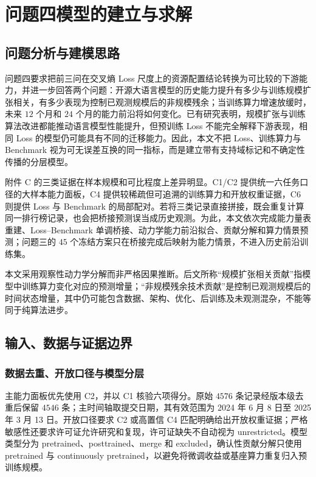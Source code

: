 \section{问题四模型的建立与求解}
\label{sec:problem4}

\subsection{问题分析与建模思路}

问题四要求把前三问在交叉熵 Loss 尺度上的资源配置结论转换为可比较的下游能力，并进一步回答两个问题：开源大语言模型的历史能力提升有多少与训练规模扩张相关，有多少表现为控制已观测规模后的非规模残余；当训练算力增速放缓时，未来 $12$ 个月和 $24$ 个月的能力前沿将如何变化。已有研究表明，规模扩张与训练算法改进都能推动语言模型性能提升，但预训练 Loss 不能完全解释下游表现，相同 Loss 的模型仍可能具有不同的迁移能力\cite{ho2024algorithmicprogress,liu2023samepretraining}。因此，本文不把 Loss、训练算力与 Benchmark 视为可无误差互换的同一指标，而是建立带有支持域标记和不确定性传播的分层模型。

附件 C 的三类证据在样本规模和可比程度上差异明显。C1/C2 提供统一六任务口径的大样本能力面板，C4 提供较稀疏但可追溯的训练算力和开放权重证据，C6 则提供 Loss 与 Benchmark 的局部配对。若将三类记录直接拼接，既会重复计算同一排行榜记录，也会把桥接预测误当成历史观测。为此，本文依次完成能力量表重建、Loss--Benchmark 单调桥接、动力学能力前沿拟合、贡献分解和算力情景预测；问题三的 $45$ 个冻结方案只在桥接完成后映射为能力情景，不进入历史前沿训练集。

本文采用观察性动力学分解而非严格因果推断。后文所称“规模扩张相关贡献”指模型中训练算力变化对应的预测增量；“非规模残余技术贡献”是控制已观测规模后的时间状态增量，其中仍可能包含数据、架构、优化、后训练及未观测混杂，不能等同于纯算法进步。

\subsection{输入、数据与证据边界}

\subsubsection{数据去重、开放口径与模型分层}

主能力面板优先使用 C2，并以 C1 核验六项得分。原始 $4576$ 条记录经版本级去重后保留 $4546$ 条；主时间轴取提交日期，其有效范围为 2024 年 6 月 8 日至 2025 年 3 月 13 日。开放口径要求 C2 或高置信 C4 匹配明确给出开放权重证据；严格敏感性还要求许可证允许研究和复现，许可证缺失不自动视为 unrestricted。模型类型分为 pretrained、posttrained、merge 和 excluded，确认性贡献分解只使用 pretrained 与 continuously pretrained，以避免将微调收益或基座算力重复归入预训练规模。

